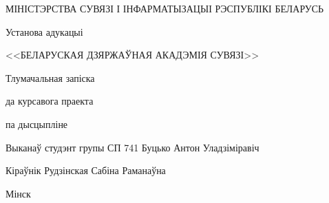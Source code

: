 \begin{TitlePage}
    МІНІСТЭРСТВА СУВЯЗІ І ІНФАРМАТЫЗАЦЫІ РЭСПУБЛІКІ БЕЛАРУСЬ

    Установа адукацыі

    <<БЕЛАРУСКАЯ ДЗЯРЖАЎНАЯ АКАДЭМІЯ СУВЯЗІ>>

    \faculty{\telecommunication}

    \department{\software}

    \vspace{5cm}
    

    \vspace{\baselineskip}

    Тлумачальная запіска

    да курсавога праекта

    па дысцыпліне

    
    \vspace{6.5cm}

    Выканаў студэнт групы СП 741 \hfill Буцько Антон Уладзіміравіч

    \vspace{\baselineskip}

    Кіраўнік \hfill Рудзінская Сабіна Раманаўна

    \vfill

    Мінск \the\year
\end{TitlePage}
